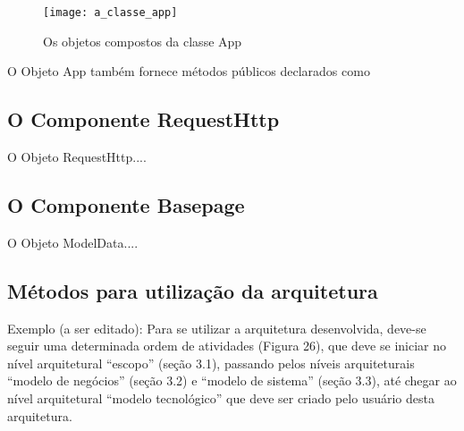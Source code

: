 \begin{figure}[h]
	\texttt{[image: a\_classe\_app]}
	\centering
	\caption{Os objetos compostos da classe App}
\end{figure}

O Objeto App também fornece métodos públicos declarados como 


\subsection{O Componente RequestHttp}\label{sec:solucao-desenvolvida}
O Objeto RequestHttp....

\subsection{O Componente Basepage}\label{sec:solucao-desenvolvida}
O Objeto ModelData....


\subsection{Métodos para utilização da arquitetura}
Exemplo (a ser editado): Para se utilizar a arquitetura desenvolvida, deve-se seguir uma determinada ordem de atividades (Figura 26), que deve se iniciar no nível arquitetural “escopo” (seção 3.1), passando pelos níveis arquiteturais “modelo de negócios” (seção 3.2) e “modelo de sistema” (seção 3.3), até chegar ao nível arquitetural “modelo tecnológico” que deve ser criado pelo usuário desta arquitetura.